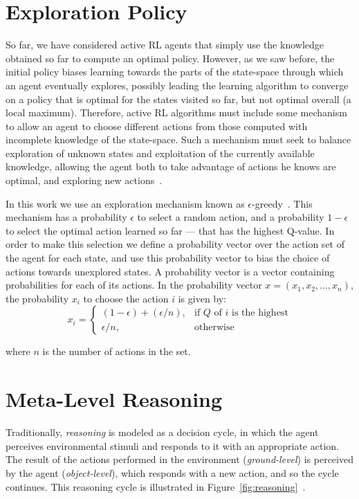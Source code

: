 \section{Exploration Policy}
\label{sec:exploration}

So far, we have considered active RL agents that simply use the knowledge obtained so far to compute an optimal policy. 
However, as we saw before, the initial policy biases learning towards the parts of the state-space through which an agent eventually explores, possibly leading the learning algorithm to converge on a policy that is optimal for the states visited so far, but not optimal overall (a local maximum). 
Therefore, active RL algorithms must include some mechanism to allow an agent to choose different actions from those computed with incomplete knowledge of the state-space. 
Such a mechanism must seek to balance exploration of unknown states and exploitation of the currently available knowledge, allowing the agent both to take advantage of actions he knows are optimal, and exploring new actions~\cite{amato2010highlevel}. 

In this work we use an exploration mechanism known as $\epsilon$-greedy~\cite{rodrigues2009dynamic}. 
This mechanism has a probability $\epsilon$ to select a random action, and a probability $1 - \epsilon$ to select the optimal action learned so far --- that has the highest Q-value.
In order to make this selection we define a probability vector over the action set of the agent for each state, and use this probability vector to bias the choice of actions towards unexplored states.
A probability vector is a vector containing probabilities for each of its actions.
In the probability vector $x = (x_1, x_2, ..., x_n)$, the probability $x_i$ to choose the action $i$ is given by: 
\[
  x_i = \left\{
  \begin{array}{ll}
    (1 - \epsilon) + (\epsilon / n), & \mbox{if $Q$ of $i$ is the highest} \\
    \epsilon / n, & \mbox{otherwise}
  \end{array}\right.
\]

where $n$ is the number of actions in the set.



\section{Meta-Level Reasoning}
\label{sec:meta-reasoning}

Traditionally, \textit{reasoning} is modeled as a decision cycle, in which the agent perceives environmental stimuli and responds to it with an appropriate action. 
The result of the actions performed in the environment (\textit{ground-level})
is perceived by the agent (\textit{object-level}), which responds with a new action,
and so the cycle continues. 
This reasoning cycle is illustrated in Figure~\ref{fig:reasoning}~\cite{cox2007metareasoning}. 

